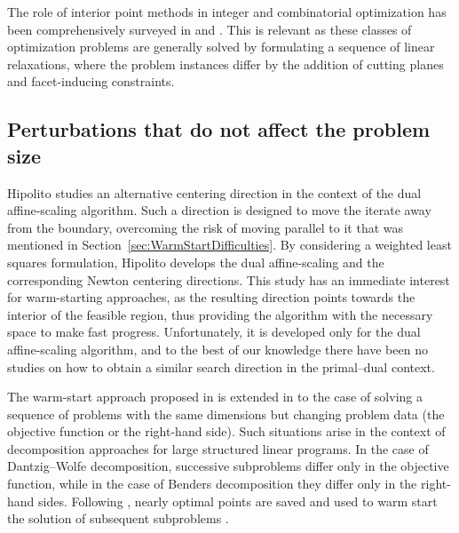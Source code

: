 The role of interior point methods in integer and combinatorial 
optimization has been comprehensively surveyed in \cite{Mitchell96} 
and \cite{MitchellPardalosResende98}. This is relevant as these classes
of optimization problems are generally solved by formulating a sequence
of linear relaxations, where the problem instances differ by the
addition of cutting planes and facet-inducing constraints.

%
%
\subsection{Perturbations that do not affect the problem size}

Hipolito \cite{Hipolito} studies an alternative centering direction 
in the context of the dual affine-scaling algorithm. Such a 
direction is designed to move the iterate away from the boundary, 
overcoming the risk of moving parallel to it that was mentioned 
in Section~\ref{sec:WarmStartDifficulties}. 
By considering a weighted least squares formulation, Hipolito 
develops the dual affine-scaling and the corresponding Newton 
centering directions. 
This study has an immediate interest for warm-starting approaches,
as the resulting direction points towards the interior of the 
feasible region, thus providing the algorithm with the necessary 
space to make fast progress. 
Unfortunately, it is developed only for the dual affine-scaling 
algorithm, and to the best of our knowledge there have been no 
studies on how to obtain a similar search direction in the 
primal--dual context.

The warm-start approach proposed in \cite{Gondzio98} is extended
in \cite{GondzioVial} to the case of solving a sequence of problems 
with the same dimensions but changing problem data (the objective 
function or the right-hand side). Such situations arise 
in the context of decomposition approaches for large structured 
linear programs. 
In the case of Dantzig--Wolfe decomposition, successive subproblems 
differ only in the objective function, while in the case 
of Benders decomposition they differ only in the right-hand sides.
Following \cite{Gondzio98}, nearly optimal points are saved and used 
to warm start the solution of subsequent subproblems \cite{GondzioVial}.


